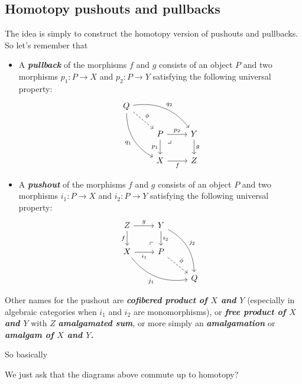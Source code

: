 \subsection{Homotopy pushouts and pullbacks}
The idea is simply to construct the homotopy version of pushouts and pullbacks. So let's remember that
\begin{defn}\leavevmode 
	\begin{itemize}
		\item A \textbf{\textit{pullback}} of the morphisms $f$ and $g$ consists of an object $P$ and two morphisms $p_1:P\to X$ and $p_2:P\to Y$ satisfying the following universal property:
		\[\begin{tikzcd}
			Q\arrow[rrd,bend left,"q_2"]\arrow[ddr,"q_1",swap,bend right]\arrow[dr,dashed,"\phi"]\\
			&P\arrow[r,"p_2"] \arrow[rd, phantom, "\lrcorner", very near start]\arrow[d,"p_1",swap]&Y\arrow[d,"g"]\\
			&X\arrow[r,"f",swap]&Z
		\end{tikzcd}\]
		\item A \textbf{\textit{pushout}} of the morphisms $f$ and $g$ consists of an object $P$ and two morphisms $i_1:P\to X$ and $i_2:P\to Y$ satisfying the following universal property:
		\[\begin{tikzcd}
			Z\arrow[r,"g"]\arrow[d,swap,"f"]&Y\arrow[d,"i_2"]\arrow[ddr,bend left,"j_2"]\\
			X\arrow[r,"i_1",swap]\arrow[drr,bend right,swap,"j_1"]&P\arrow[ul, phantom, "\ulcorner", very near start]\arrow[dr,dashed,"\phi"]\\
			&&Q
		\end{tikzcd}\]
	\end{itemize}
		\begin{remark}
			Other names for the pushout are \textbf{\textit{cofibered product of $X$ and $Y$}} (especially in algebraic categories when $i_1$ and $i_2$ are monomorphisms), or \textbf{\textit{free product of $X$ and $Y$}} with $Z$ \textbf{\textit{amalgamated sum}}, or more simply an \textbf{\textit{amalgamation}} or \textbf{\textit{amalgam of $X$ and $Y$.}}
		\end{remark}
	\end{defn}
		So basically
\begin{defn}
	{\color{magenta}We just ask that the diagrams above commute up to homotopy?}
\end{defn}
